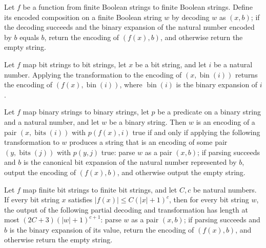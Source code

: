 \begin{definition}
\label{Complexity.compQ}
\leanok
{}
Let $f$ be a function from finite Boolean strings to finite Boolean strings. Define its
encoded composition on a finite Boolean string $w$ by decoding $w$ as $(x,b)$; if the
decoding succeeds and the binary expansion of the natural number encoded by $b$ equals
$b$, return the encoding of $(f(x),b)$, and otherwise return the empty string.
\end{definition}

\begin{theorem}
\label{Complexity.compQ_pairEncode}
\leanok
{}
Let $f$ map bit strings to bit strings, let $x$ be a bit string, and let $i$ be a
natural number. Applying the transformation to the encoding of
$(x,\operatorname{bin}(i))$ returns the encoding of $(f(x),\operatorname{bin}(i))$,
where $\operatorname{bin}(i)$ is the binary expansion of $i$.
\end{theorem}

\begin{theorem}
\label{Complexity.mem_indexLang_compQ_iff}
\leanok
{}
Let $f$ map binary strings to binary strings, let $p$ be a predicate on a binary string
and a natural number, and let $w$ be a binary string. Then $w$ is an encoding of a pair
$(x,\operatorname{bits}(i))$ with $p(f(x),i)$ true if and only if applying the following
transformation to $w$ produces a string that is an encoding of some pair
$(y,\operatorname{bits}(j))$ with $p(y,j)$ true: parse $w$ as a pair $(x,b)$; if parsing
succeeds and $b$ is the canonical bit expansion of the natural number represented by
$b$, output the encoding of $(f(x),b)$, and otherwise output the empty string.
\end{theorem}

\begin{theorem}
\label{Complexity.compQ_length_le}
\leanok
{}
Let $f$ map finite bit strings to finite bit strings, and let $C,c$ be natural numbers.
If every bit string $x$ satisfies $|f(x)|\le C(|x|+1)^c$, then for every bit string $w$,
the output of the following partial decoding and transformation has length at most
$(2C+3)(|w|+1)^{c+1}$: parse $w$ as a pair $(x,b)$; if parsing succeeds and $b$ is the
binary expansion of its value, return the encoding of $(f(x),b)$, and otherwise return
the empty string.
\end{theorem}

